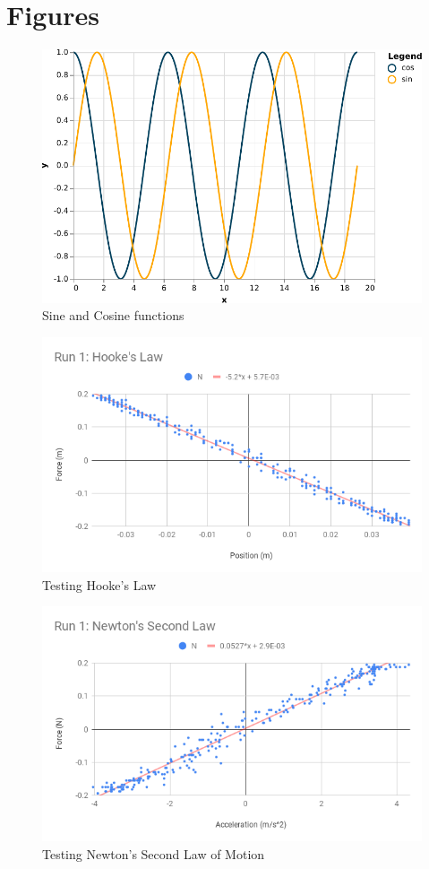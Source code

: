 \section{Figures}
%
\begin{figure}[ht]
    \centering
    \includegraphics{chart/11-shm/trig.pdf}
    \caption{Sine and Cosine functions}
    \label{figure:11.sin.cos}
\end{figure}
%
\begin{figure}[ht]
    \centering
    \includegraphics[scale=0.71]{image/11-shm/run-1-hooke.png}
    \caption{Testing Hooke's Law}
    \label{figure.11.hooke}
\end{figure}
%
\begin{figure}[ht]
    \centering
    \includegraphics[scale=0.71]{image/11-shm/run-1-newton.png}
    \caption{Testing Newton's Second Law of Motion}
    \label{figure.11.newton}
\end{figure}
